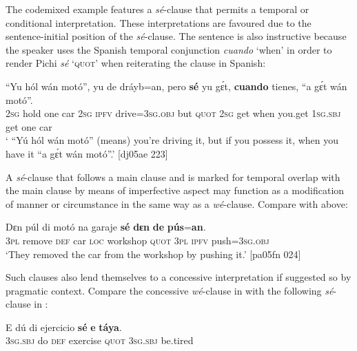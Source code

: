 The codemixed example  features a \textit{sé}{}-clause that permits a temporal or conditional interpretation. These interpretations are favoured due to the sentence-initial position of the \textit{sé}{}-clause. The sentence is also instructive because the speaker uses the Spanish temporal conjunction \textit{cuando} ‘when’ in order to render Pichi \textit{sé} ‘\textsc{quot}’ when reiterating the clause in Spanish:


\ea%
    \label{ex:key:1468}
    \gll “Yu  hól    wán  motó”,  yu  de  dráyb=an,  pero  \textbf{sé}    yu  gɛ́t,
\textbf{cuando}  tienes,  “a    gɛ́t  wán    motó”.\\
\phantom{“}\textsc{2sg}  hold    one  car    \textsc{2sg}  \textsc{ipfv}  drive=\textsc{3sg.obj}  but    \textsc{quot}    \textsc{2sg}  get
when  you.get  \textsc{1sg.sbj}  get  one    car\\
\glt ` “Yú hól wán motó” (means) you’re driving it, but if you possess it, 
when you have it “a gɛ́t wán motó”.’ [dj05ae 223]
\z

A \textit{sé}{}-clause that follows a main clause and is marked for temporal overlap with the main clause by means of imperfective aspect may function as a modification of manner or circumstance in the same way as a \textit{wé}{}-clause. Compare  with  above: 


\ea%
    \label{ex:key:1469}
    \gll Dɛn  púl    di  motó  na  garaje    \textbf{sé}    \textbf{dɛn}  \textbf{de}  \textbf{pús}=\textbf{an}.\\
\textsc{3pl}  remove  \textsc{def}  car    \textsc{loc}  workshop  \textsc{quot}    \textsc{3pl}  \textsc{ipfv}  push=\textsc{3sg.obj}\\

\glt ‘They removed the car from the workshop by pushing it.’ [pa05fn 024]
\z

Such clauses also lend themselves to a concessive interpretation if suggested so by pragmatic context. Compare the concessive \textit{wé}{}-clause in  with the following \textit{sé}{}-clause in :


\ea%
    \label{ex:key:1470}
    \gll E    dú  di  ejercicio    \textbf{sé}    \textbf{e}    \textbf{táya}.\\
\textsc{3sg.sbj}  do  \textsc{def}  exercise    \textsc{quot}    \textsc{3sg.sbj}  be.tired\\

